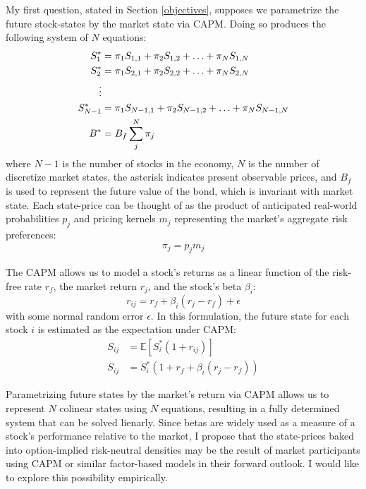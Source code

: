 \documentclass[final,3p,times,authoryear]{elsarticle}
\begin{document}
  My first question, stated in Section \ref{objectives}, supposes we parametrize the future stock-states by the market state via CAPM. Doing so produces the following system of $N$ equations:
  \begin{align}
      S^{\ast}_{1} &= \pi_{1} S_{1,1} + \pi_{2} S_{1,2} + \mathellipsis + \pi_{N} S_{1,N}\\
      S^{\ast}_{2} &= \pi_{1} S_{2,1} + \pi_{2} S_{2,2} + \mathellipsis + \pi_{N} S_{2,N}\\
      \vdots\\
      S^{\ast}_{N-1} &= \pi_{1} S_{N-1,1} + \pi_{2} S_{N-1,2} + \mathellipsis + \pi_{N} S_{N-1,N}\\
      B^{\ast} &= B_f  	\displaystyle\sum_{j}^N{\pi_{j}}
  \end{align}
  where $N-1$ is the number of stocks in the economy, $N$ is the number of discretize market states, the asterisk indicates present observable prices, and $B_f$ is used to represent the future value of the bond, which is invariant with market state. Each state-price can be thought of as the product of anticipated real-world probabilities $p_j$ and pricing kernels $m_j$ representing the market's aggregate risk preferences:
  \begin{align}
    \pi_j = p_j m_j
  \end{align}

  The CAPM allows us to model a stock's returns as a linear function of the risk-free rate $r_f$, the market return $r_j$, and the stock's beta $\beta_i$:
  \[r_{ij} = r_f + \beta_i (r_j - r_f) + \epsilon\]
  with some normal random error $\epsilon$. In this formulation, the future state for each stock $i$ is estimated as the expectation under CAPM:
  \begin{align}
    S_{ij} &=  \mathbb{E}[S^{\ast}_i (1 + r_{ij})]\\
    S_{ij} &= S^{\ast}_i (1 + r_f + \beta_i (r_j - r_f))
  \end{align}
  
  Parametrizing future states by the market's return via CAPM allows us to represent $N$ colinear states using $N$ equations, resulting in a fully determined system that can be solved lienarly. Since betas are widely used as a measure of a stock's performance relative to the market, I propose that the state-prices baked into option-implied risk-neutral densities may be the result of market participants using CAPM or similar factor-based models in their forward outlook. I would like to explore this possibility empirically.
\end{document}

